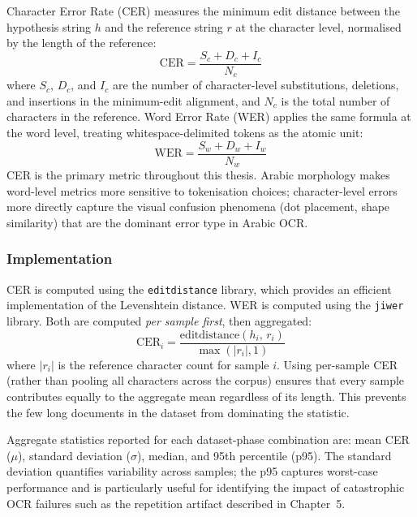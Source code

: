 Character Error Rate (CER) measures the minimum edit distance between the hypothesis
string $h$ and the reference string $r$ at the character level, normalised by the
length of the reference:
\begin{equation}\label{eq:cer}
  \mathrm{CER} = \frac{S_c + D_c + I_c}{N_c}
\end{equation}
where $S_c$, $D_c$, and $I_c$ are the number of character-level substitutions,
deletions, and insertions in the minimum-edit alignment, and $N_c$ is the total
number of characters in the reference.
Word Error Rate (WER) applies the same formula at the word level, treating
whitespace-delimited tokens as the atomic unit:
\begin{equation}\label{eq:wer}
  \mathrm{WER} = \frac{S_w + D_w + I_w}{N_w}
\end{equation}
CER is the primary metric throughout this thesis.
Arabic morphology makes word-level metrics more sensitive to tokenisation choices;
character-level errors more directly capture the visual confusion phenomena (dot
placement, shape similarity) that are the dominant error type in Arabic OCR.

\subsubsection{Implementation}

CER is computed using the \texttt{editdistance} library, which provides an
efficient implementation of the Levenshtein distance.
WER is computed using the \texttt{jiwer} library.
Both are computed \emph{per sample first}, then aggregated:
\begin{equation}\label{eq:sample_cer}
  \mathrm{CER}_i = \frac{\mathrm{editdistance}(h_i,\, r_i)}{\max(|r_i|, 1)}
\end{equation}
where $|r_i|$ is the reference character count for sample $i$.
Using per-sample CER (rather than pooling all characters across the corpus) ensures
that every sample contributes equally to the aggregate mean regardless of its length.
This prevents the few long documents in the dataset from dominating the statistic.

Aggregate statistics reported for each dataset-phase combination are:
mean CER ($\mu$), standard deviation ($\sigma$), median, and 95th percentile (p95).
The standard deviation quantifies variability across samples; the p95 captures
worst-case performance and is particularly useful for identifying the impact of
catastrophic OCR failures such as the repetition artifact described in Chapter~5.

